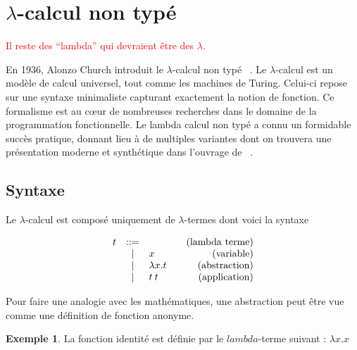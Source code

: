 \documentclass {article}
\makeatletter
\theoremstyle{definition}
\newtheorem{example}{Exemple}
\theoremstyle{remark}
\newcommand{\todo}[1]{\textcolor{red}{#1}}
\newenvironment{bnf}
               {\[\begin{array}{lcl@{\qquad}r}}
               {\end{array}\]}
\makeatother
\begin{document}
\section{$\lambda$-calcul non typé}
\label{sec:untyped}

\todo{Il reste des ``lambda'' qui devraient être des $\lambda$.}

En 1936, Alonzo Church introduit le $\lambda$-calcul non typé
~\citep{church:lambda-calcul}. Le $\lambda$-calcul est
un modèle de calcul universel, tout comme les machines de Turing. Celui-ci repose
sur une syntaxe minimaliste capturant exactement la notion de fonction. Ce formalisme est au c\oe{}ur de nombreuses recherches dans le domaine de la 
programmation fonctionnelle. Le lambda calcul non typé a connu un formidable 
succès pratique, donnant lieu à de multiples variantes dont on trouvera une présentation
 moderne et synthétique dans l'ouvrage de ~\citet{pierce:tapl}.

\subsection{Syntaxe}
Le $\lambda$-calcul est composé uniquement de \(\lambda\)-termes dont voici la syntaxe

\newcommand{\Lam}[2]{\ensuremath{\lambda #1. #2}}
\newcommand{\App}[2]{\ensuremath{#1\:#2}}
\newcommand{\Var}[1]{\ensuremath{#1}}
\newcommand{\Fst}[1]{\ensuremath{#1.\pi_0}}
\newcommand{\Snd}[1]{\ensuremath{#1.\pi_1}}
\newcommand{\Pair}[2]{\ensuremath{(#1, #2)}}
\newcommand{\ifte}[3]{\ensuremath{\mathsf{if}\: #1\: \mathsf{then}\: #2\: \mathsf{else}\: #3}}
\newcommand{\true}{\ensuremath{\mathsf{true}}}
\newcommand{\false}{\ensuremath{\mathsf{false}}}
\newcommand{\zero}{\ensuremath{\mathsf{zero}}} 
\newcommand{\succs}{\ensuremath{\mathsf{succ}}}
\newcommand{\iter}{\ensuremath{\mathsf{iter}}}


\begin{bnf}
  t &::= & &\mbox{(lambda terme)} \\
  &|& \Var{x} & \mbox{(variable)} \\
  &|& \Lam{x}{t} & \mbox{(abstraction)} \\
  &|& \App{t}{t}          & \mbox{(application)}
\end{bnf}

Pour faire une analogie avec les mathématiques, une abstraction peut
être vue comme une définition de fonction anonyme.
 
\begin{example}
 La fonction identité est définie par le $lambda$-terme suivant : $\Lam{x}{\Var{x}}$
\end{example}
\end{document}
